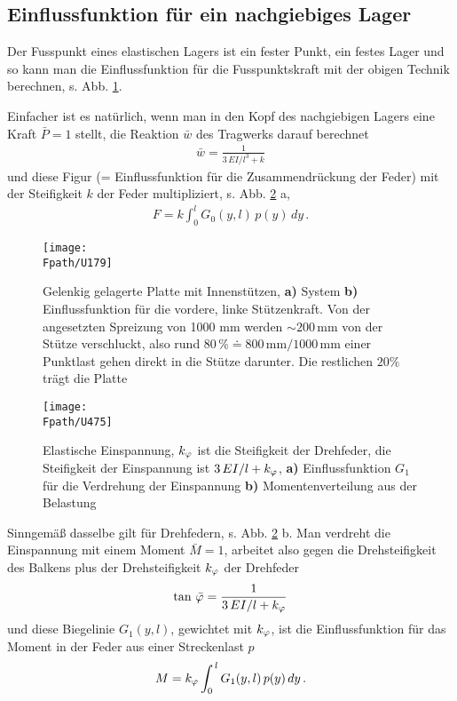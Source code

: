 {{{%
{\textcolor{sectionTitleBlue}{\section{Einflussfunktion f\"{u}r ein nachgiebiges Lager}}}
Der Fusspunkt eines elastischen Lagers ist ein fester Punkt, ein festes Lager und so kann man die Einflussfunktion f\"{u}r die Fusspunktskraft mit der obigen Technik berechnen, s. Abb. \ref{U179}.

Einfacher ist es nat\"{u}rlich, wenn man in den Kopf des nachgiebigen Lagers eine Kraft $\bar{P} = 1$ stellt, die Reaktion $\bar{w}$ des Tragwerks darauf berechnet
\begin{align}
\bar{w} = \frac{1}{3\,EI/l^3 + k}
\end{align}
und diese Figur (= Einflussfunktion f\"{u}r die Zusammendr\"{u}ckung der Feder) mit der Steifigkeit $k$ der Feder multipliziert, s. Abb. \ref{U475} a,
\begin{align}
F = k \int_{0}^{l} G_0(y,l)\,p(y)\,dy\,.
\end{align}

\begin{figure}[tbp]
\centering
\texttt{[image: \\Fpath/U179]}
\caption{Gelenkig gelagerte Platte mit Innenst\"{u}tzen, \textbf{ a)} System \textbf{ b)} Einflussfunktion f\"{u}r die vordere, linke St\"{u}tzenkraft. Von der angesetzten Spreizung von 1000 mm werden $\sim 200$\,mm von der St\"{u}tze \glq verschluckt\grq{}, also rund $80\, \% \doteq 800 \, \text{mm}/1000\,\text{mm}$ einer Punktlast gehen direkt in die St\"{u}tze darunter. Die restlichen $20 \%$ tr\"{a}gt die Platte} \label{U179}
\end{figure}%

\begin{figure}[tbp]
\centering
\texttt{[image: \\Fpath/U475]}
\caption{Elastische Einspannung, $k_\varphi$ ist die Steifigkeit der Drehfeder, die Steifigkeit der Einspannung ist $3\,EI/l + k_\varphi$, \textbf{ a)} Einflussfunktion $G_1$ f\"{u}r die Verdrehung der Einspannung \textbf{ b)} Momentenverteilung aus der Belastung} \label{U475}
\end{figure}%
Sinngem\"{a}{\ss} dasselbe gilt f\"{u}r Drehfedern, s. Abb. \ref{U475} b. Man verdreht die Einspannung mit einem Moment $\bar{M} = 1$, arbeitet also gegen die Drehsteifigkeit des Balkens plus der Drehsteifigkeit $k_\varphi$ der Drehfeder
\begin{align}
\tan\,\bar{\varphi} = \frac{1}{3\,EI/l + k_\varphi}
\end{align}
und diese Biegelinie $G_1(y,l)$, gewichtet mit $k_\varphi$, ist die Einflussfunktion f\"{u}r das Moment in der Feder aus einer Streckenlast $p$
\begin{align}
M = k_\varphi \int_0^{\,l} G_1(y,l)\,p(y)\,dy\,.
\end{align}

}}}
